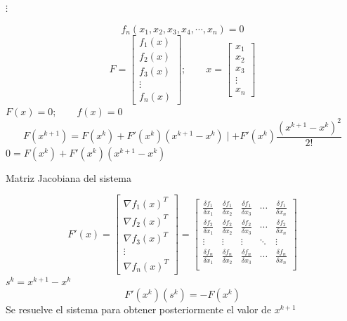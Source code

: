 \begin{center}
$\vdots$
\end{center}
\begin{displaymath}
f_n(x_1,x_2,x_3,x_4,\cdots, x_n)=0
\end{displaymath}
\begin{displaymath}
F=\begin{bmatrix}
f_1(x)\\
f_2(x)\\
f_3(x)\\
\vdots \\
f_n(x)
\end{bmatrix}; \qquad x=\begin{bmatrix}
x_1\\
x_2\\
x_3\\
\vdots \\
x_n
\end{bmatrix}
\end{displaymath}
$F(x)=0; \qquad f(x)=0$\\
\begin{displaymath}
F(x^{k+1})=F(x^k)+F'(x^k)(x^{k+1}-x^k)\mid +F'(x^k)\frac{(x^{k+1}-x^k)^2}{2!}
\end{displaymath}
$0=F(x^k)+F'(x^k)(x^{k+1}-x^k)$\\
\begin{center}
Matriz Jacobiana del sistema
\end{center}
\begin{displaymath}
F'(x)=\begin{bmatrix}
\nabla f_1(x)^T \\
\nabla f_2(x)^T \\
\nabla f_3(x)^T \\
\vdots \\
\nabla f_n(x)^T
\end{bmatrix}=\begin{bmatrix}
\frac{\delta f_1}{\delta x_1} & \frac{\delta f_1}{\delta x_2} & \frac{\delta f_1}{\delta x_3} & \cdots & \frac{\delta f_1}{\delta x_n} \\
\frac{\delta f_2}{\delta x_1} & \frac{\delta f_2}{\delta x_2} & \frac{\delta f_2}{\delta x_3} & \cdots & \frac{\delta f_2}{\delta x_n} \\
\vdots & \vdots & \vdots & \ddots & \vdots \\ \frac{\delta f_n}{\delta x_1} & \frac{\delta f_n}{\delta x_2} & \frac{\delta f_n}{\delta x_3} & \cdots & \frac{\delta f_n}{\delta x_n} \\
\end{bmatrix}
\end{displaymath}
$s^k=x^{k+1}-x^k$\\
\begin{displaymath}
F'(x^k)(s^k)=-F(x^k)
\end{displaymath}
Se resuelve el sistema para obtener posteriormente el valor de $x^{k+1}$



